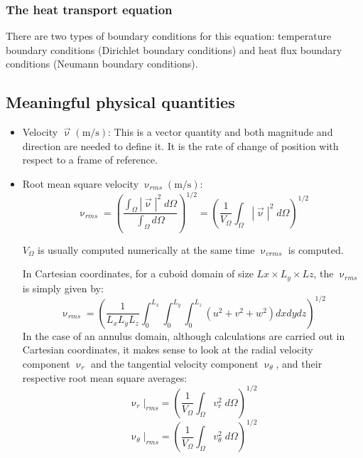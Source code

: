 \subsubsection{The heat transport equation}

There are two types of boundary conditions for this equation: temperature boundary conditions (Dirichlet boundary conditions) and heat flux boundary conditions (Neumann boundary conditions). 

\newpage
\subsection{Meaningful physical quantities}

\begin{itemize}
\item Velocity $\vec \upnu (\text{m/s})$: This is a vector quantity and both magnitude and direction are needed to define it. It is the rate of change of position with respect to a frame of reference.
\item Root mean square velocity $\upnu_{rms} (\text{m/s})$: 
\begin{equation}
\upnu_{rms} = \left ( \frac{\int_\Omega |{\vec \upnu}|^2 \;  d \Omega}{\int_\Omega d\Omega }  \right )^{1/2}
=\left ( \frac{1}{V_\Omega} \int_\Omega |{\vec \upnu}|^2 \;  d \Omega \right )^{1/2} \label{eqVrms}
\end{equation}
\begin{remark}
$V_\Omega$ is usually computed numerically at the same time $\upnu_{vrms}$ is computed.
\end{remark}
In Cartesian coordinates, for a cuboid domain of size $Lx\times L_y \times Lz$, 
the $\upnu_{rms}$ is simply given by:
\begin{equation}
\upnu_{rms}  = \left ( \frac{1}{L_xL_yL_z} \int_0^{L_x}\int_0^{L_y}\int_0^{L_z} 
(u^2 + v^2 + w^2) dxdydz  \right )^{1/2}
\end{equation}
In the case of an annulus domain, although calculations are carried out 
in Cartesian coordinates, it makes sense
to look at the radial velocity component $\upnu_r$ and the tangential velocity 
component $\upnu_\theta$, and their respective
root mean square averages:
\begin{equation}
\upnu_r|_{rms}  =\left ( \frac{1}{V_\Omega} \int_\Omega v_r^2 \;  d \Omega \right )^{1/2} \label{eqVrVrms}
\end{equation}
\begin{equation}
\upnu_\theta|_{rms}  = \left ( \frac{1}{V_\Omega} \int_\Omega v_\theta^2 \;  d \Omega \right )^{1/2} \label{eqThetaVrms}
\end{equation}



\end{itemize}
